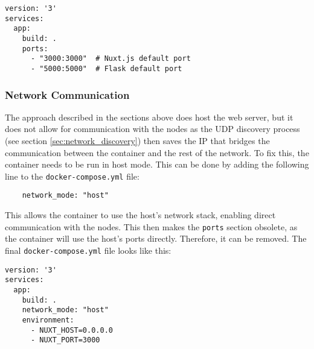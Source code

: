         \begin{verbatim}
version: '3'
services:
  app:
    build: .
    ports:
      - "3000:3000"  # Nuxt.js default port
      - "5000:5000"  # Flask default port

        \end{verbatim}


        \subsubsection{Network Communication}
        The approach described in the sections above does host the 
        web server, but it does not allow for communication with the
        nodes as the UDP discovery process (see section \ref{sec:network_discovery})
        then saves the IP that bridges the communication between the container
        and the rest of the network. To fix this, the container needs to be
        run in host mode. This can be done by adding the following line to the
        \texttt{docker-compose.yml} file:

        \begin{verbatim}
    network_mode: "host"
        \end{verbatim}

        This allows the container to use the host's network stack, enabling
        direct communication with the nodes.
        This then makes the \texttt{ports} section obsolete, as the container will
        use the host's ports directly. Therefore, it can be removed. The final
        \texttt{docker-compose.yml} file looks like this:

        \begin{verbatim}
version: '3'
services:
  app:
    build: .
    network_mode: "host"
    environment:
      - NUXT_HOST=0.0.0.0
      - NUXT_PORT=3000

      \end{verbatim}
